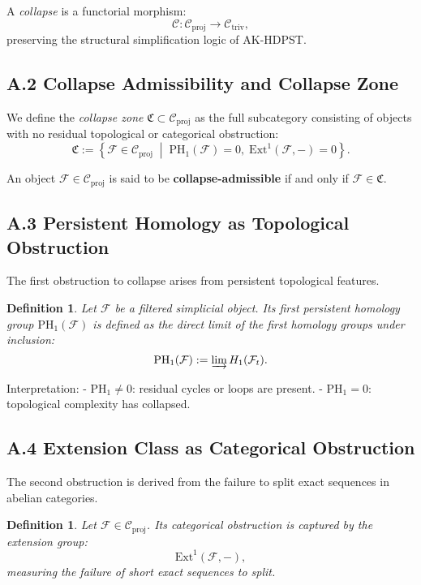 \documentclass[11pt]{article}
\newtheorem{definition}[theorem]{Definition}
\begin{document}
A \emph{collapse} is a functorial morphism:
\[
\mathcal{C} : \mathcal{C}_{\mathrm{proj}} \longrightarrow \mathcal{C}_{\mathrm{triv}},
\]
preserving the structural simplification logic of AK-HDPST.

\subsection*{A.2 Collapse Admissibility and Collapse Zone}

We define the \emph{collapse zone} \( \mathfrak{C} \subset \mathcal{C}_{\mathrm{proj}} \) as the full subcategory consisting of objects with no residual topological or categorical obstruction:
\[
\mathfrak{C} := \left\{ \mathcal{F} \in \mathcal{C}_{\mathrm{proj}} \;\middle|\; \mathrm{PH}_1(\mathcal{F}) = 0,\; \mathrm{Ext}^1(\mathcal{F}, -) = 0 \right\}.
\]

\noindent An object \( \mathcal{F} \in \mathcal{C}_{\mathrm{proj}} \) is said to be \textbf{collapse-admissible} if and only if \( \mathcal{F} \in \mathfrak{C} \).

\subsection*{A.3 Persistent Homology as Topological Obstruction}

The first obstruction to collapse arises from persistent topological features.

\begin{definition}
Let \( \mathcal{F} \) be a filtered simplicial object. Its first persistent homology group \( \mathrm{PH}_1(\mathcal{F}) \) is defined as the direct limit of the first homology groups under inclusion:
\[
\mathrm{PH}_1(\mathcal{F}) := \varinjlim H_1(\mathcal{F}_t).
\]
\end{definition}

\noindent Interpretation:
- \( \mathrm{PH}_1 \neq 0 \): residual cycles or loops are present.
- \( \mathrm{PH}_1 = 0 \): topological complexity has collapsed.

\subsection*{A.4 Extension Class as Categorical Obstruction}

The second obstruction is derived from the failure to split exact sequences in abelian categories.

\begin{definition}
Let \( \mathcal{F} \in \mathcal{C}_{\mathrm{proj}} \). Its categorical obstruction is captured by the extension group:
\[
\mathrm{Ext}^1(\mathcal{F}, -),
\]
measuring the failure of short exact sequences to split.
\end{definition}
\end{document}
